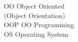 \begin{tabbing}


    \>OO \>\>Object Oriented\\
        \>\>\>(Object Orientation)\\





    \>OOP \>\>OO Programming\\









    \>OS \>\>Operating System\\






\end{tabbing}
